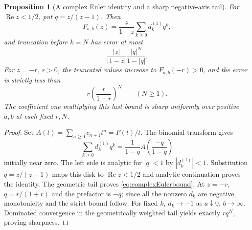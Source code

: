 \documentclass[11pt]{article}
\numberwithin{equation}{section}
\newtheorem{proposition}[theorem]{Proposition}
\theoremstyle{definition}
\theoremstyle{remark}
\DeclareMathOperator{\Repart}{Re}
\begin{document}
\begin{proposition}[A complex Euler identity and a sharp negative-axis tail]
\label{prop:complexEuler}
For $\Repart z<1/2$, put $q=z/(z-1)$. Then
\begin{equation}\label{eq:complexEuler}
 F_{a,b}(z)=\frac z{1-z}\sum_{k\ge0}d_k^{(1)}q^k,
\end{equation}
and truncation before $k=N$ has error at most
\begin{equation}\label{eq:complexEulerbound}
 \frac{|z|}{|1-z|}\frac{|q|^N}{1-|q|}.
\end{equation}
For $z=-r$, $r>0$, the truncated values increase to $F_{a,b}(-r)>0$,
and the error is strictly less than
\begin{equation}\label{eq:negativeEulerbound}
 r\left(\frac r{1+r}\right)^N\qquad(N\ge1).
\end{equation}
The coefficient one multiplying this last bound is sharp uniformly
over positive $a,b$ at each fixed $r,N$.
\end{proposition}
\begin{proof}
Set $A(t)=\sum_{n\ge0}c_{n+1}t^n=F(t)/t$. The binomial
transform gives
\[
 \sum_{k\ge0}d_k^{(1)}q^k
 =\frac1{1-q}A\left(\frac{-q}{1-q}\right)
\]
initially near zero. The left side is analytic for $|q|<1$ by
$|d_k^{(1)}|<1$. Substitution $q=z/(z-1)$ maps this disk to
$\Repart z<1/2$ and analytic continuation proves the identity.
The geometric tail proves \eqref{eq:complexEulerbound}.
At $z=-r$, $q=r/(1+r)$ and the prefactor is $-q$; since all the
nonzero $d_k$ are negative, monotonicity and the strict bound follow.
For fixed $k$, $d_k\to-1$ as $a\downarrow0$, $b\to\infty$.
Dominated convergence in the geometrically weighted tail yields
exactly $rq^N$, proving sharpness.
\end{proof}
\end{document}
